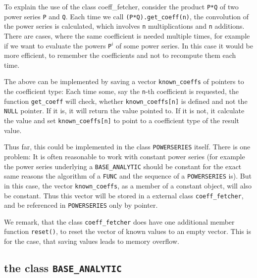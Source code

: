 \documentclass{article}
\newcommand{\code}[1]{\texttt{#1}}
\newcommand{\func}[1]{\texttt{#1}}
\newcommand{\NULL}{\texttt{NULL} pointer\xspace}
\begin{document}
To explain the use of the class coeff\_fetcher, consider the product \code{P*Q} of two power series \code{P} and \code{Q}. Each time we call \code{(P*Q).get\_coeff(n)}, the convolution of the power series is calculated, which involves \code{n} multiplications and \code{n} additions. There are cases, where the same coefficient is needed multiple times, for example if we want to evaluate the powers \code{P}$^i$ of some power series. In this case it would be more efficient, to remember the coefficients and not to recompute them each time.

The above can be implemented by saving a vector \code{known\_coeffs} of pointers to the coefficient type: Each time some, say the \code{n}-th coefficient is requested, the function \code{get\_coeff} will check, whether \code{known\_coeffs[n]} is defined and not the \NULL. If it is, it will return the value pointed to. If it is not, it calculate the value and set \code{known\_coeffs[n]} to point to a coefficient type of the result value.

Thus far, this could be implemented in the class \func{POWERSERIES} itself. There is one problem: It is often reasonable to work with constant power series (for example the power series underlying a \func{BASE\_ANALYTIC} should be constant for the exact same reasons the algorithm of a \func{FUNC} and the sequence of a \func{POWERSERIES} is). But in this case, the vector \code{known\_coeffs}, as a member of a constant object, will also be constant. Thus this vector will be stored in a external class \func{coeff\_fetcher}, and be referenced in \func{POWERSERIES} only by pointer.

We remark, that the class \func{coeff\_fetcher} does have one additional member function \code{reset()}, to reset the vector of known values to an empty vector. This is for the case, that saving values leads to memory overflow.

\subsection{the class \func{BASE\_ANALYTIC}}
\end{document}
